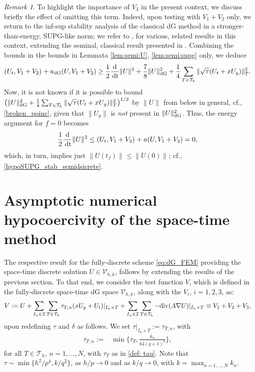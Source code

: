 \documentclass{amsart}
\newcommand{\norm}[2]{\|{#1}\|_{{#2}}}
\newcommand{\dee}{{\rm d}}
\newcommand{\su}{\sum_{T \in \Th}}
\newcommand{\inner}[3]{({#1},{#2})_{{#3}}}
\newcommand{\Th}{\mathcal{T}_h}
\newcommand{\Div}{{\rm div}}
\newcommand{\dt}{\,{\rm dt}}
\theoremstyle{definition}
\theoremstyle{remark}
\newtheorem{remark}[theorem]{Remark}
\numberwithin{equation}{section}
\begin{document}
\begin{remark}\label{remark_stab}
To highlight the importance of $V_3$ in the present context, we discuss briefly the effect of omitting this term. Indeed, upon testing with $V_1+V_2$ only, we return to the inf-sup stability analysis of the classical dG method in a stronger-than-energy, SUPG-like norm; we refer to \cite{ayuso_marini,cdgh16,MR3672375}, for various, related results in this context, extending the seminal, classical result presented in \cite{johnson_pitkaranta}. Combining the bounds in the bounds in Lemmata \ref{lem:semi:U}, \ref{lem:semi:supg} only, we deduce
  \begin{equation*}
	\inner{U_t}{V_1+V_2}{} + a_{\rm dG}(U,V_1+V_2)
	\geq
	\frac{1}{2}\frac{\dee}{\dt} \norm{U}{}^2
	+
	\frac{7}{8}\norm{U}{\rm dG}^2
+
	\frac{1}{4} \sum_{T \in \Th} \norm{ \sqrt{\tau}(U_t + xU_y) }{T}^2.
\end{equation*}
Now,  {it is not known if it is possible to bound $\big(\norm{U}{\rm dG}^2
+
\frac{1}{4} \sum_{T \in \Th} \norm{ \sqrt{\tau}(U_t + xU_y) }{T}^2\big)^{1/2}$ by $\norm{U}{}$ from below in general},  cf., \eqref{broken_poinc}, given that $\|U_y\|$ is \emph{not} present in $\norm{U}{\rm dG}^2$. Thus, the energy argument for $f=0$ becomes
\[
	\frac{1}{2}\frac{\dee}{\dt}\norm{U}{}^2
	\le   \inner{U_t}{V_1+V_2}{}  + a(U,V_1+V_2)= 0,
\]
which, in turn, implies just $ \norm{U(t_f)}{}\le  \norm{U(0)}{}$; cf., \eqref{hypoSUPG_stab_semidsicrete}.
\end{remark}




\section{Asymptotic numerical hypocoercivity of the space-time method}\label{sec:fullDiscrete}
The respective result for the fully-discrete scheme \eqref{eq:dG_FEM} providing the space-time discrete solution $U\in  {\mathcal{V}}_{h,k}$, follows by extending the results of the previous section. To that end, we consider the test function $V$,  {which is defined in the fully-discrete space-time dG space $\mathcal{V}_{h,k}$}, along with the $V_i$, $i=1,2,3$, as:
\begin{equation}\label{FDV}
V: = U + \sum_{I_n \in \mathcal{I}} \su\tau_{T,n} (x U_y + U_t)|_{I_n\times T}
+ \sum_{I_n \in \mathcal{I}} \su -\Div(A \nabla U)|_{I_n\times T} \equiv V_1+ V_2 +V_3,
\end{equation}
upon redefining $\tau$ and $\delta$ as follows. We set $\tau|_{I_n\times T}:= \tau_{T,n}$, with
\begin{equation}\label{def: tau_st}
\begin{split}
 \tau_{T,n}
    := &
    \min \Big\{\tau_T,
 \frac{k_n}{64(q+1)^2}
        \Big\},
    \end{split}
\end{equation}
for all $T \in \Th$, $n = 1,\dots, N$, with $\tau_T$ as in \eqref{def: tau}. Note that  $\tau \sim \min\{ h^2/p^4, k/q^2\}$,  as $h/p\to 0$ and as $k/q\to 0$, with $k=\max_{n=1,\dots,N} k_n$.
\end{document}
